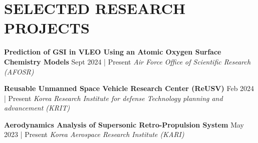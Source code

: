 \section{SELECTED RESEARCH PROJECTS}
\resumeSubHeadingListStart

    \resumeProjectHeading
    {\textbf{Prediction of GSI in VLEO Using an Atomic Oxygen Surface Chemistry Models}}    {Sept 2024 | Present}
    {\emph{Air Force Office of Scientific Research (AFOSR)}}{}
    
    \resumeProjectHeading
    {\textbf{Reusable Unmanned Space Vehicle Research Center (ReUSV)}}    {Feb 2024 | Present}
    {\emph{Korea Research Institute for defense Technology planning and advancement (KRIT)}}{}

    \resumeProjectHeading
    {\textbf{Aerodynamics Analysis of Supersonic Retro-Propulsion System}}    {May 2023 | Present}
    {\emph{Korea Aerospace Research Institute (KARI)}}{}

\resumeSubHeadingListEnd